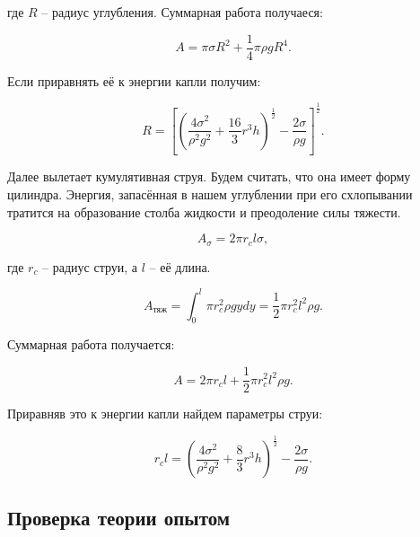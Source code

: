 \documentclass[a4paper, 12pt]{article}
\begin{document}
где $R$ -- радиус углубления.
Суммарная работа получаеся:

\begin{equation}
    A = \pi\sigma{R^2} + \frac{1}{4}\pi{\rho}gR^4.
\end{equation}

Если приравнять её к энергии капли получим:

\begin{equation}
    R = \left [\left (\frac{4\sigma^2}{\rho^2g^2} +
               \frac{16}{3}r^3h \right )^\frac{1}{2}
               - \frac{2\sigma}{\rho{g}} \right ] ^ \frac{1}{2}.
\end{equation}


Далее вылетает кумулятивная струя. Будем считать, что она имеет форму
цилиндра. Энергия, запасённая в нашем углублении при его схлопывании
тратится на образование столба жидкости и преодоление силы тяжести.

\begin{equation}
    A_\sigma = 2\pi{r_c}l\sigma,
\end{equation}

где $r_c$ -- радиус струи, а $l$ -- её длина.

\begin{equation}
    A_\text{тяж} = \int_{0}^{l} \pi{r_c^2}\rho{g}ydy =
                   \frac{1}{2}\pi{r_c^2}l^2\rho{g}.
\end{equation}

Суммарная работа получается:

\begin{equation}
    A = 2\pi{r_c}l + \frac{1}{2}\pi{r_c^2}l^2\rho{g}.
\end{equation}

Приравняв это к энергии капли найдем параметры струи:

\begin{equation}
    r_cl = \left (\frac{4\sigma^2}{\rho^2g^2} + \frac{8}{3}
                  r^3h \right ) ^ \frac{1}{2} - \frac{2\sigma}{\rho{g}}.
\end{equation}

\newpage

\begin{center}
    \subsection*{Проверка теории опытом}
\end{center}
\end{document}
